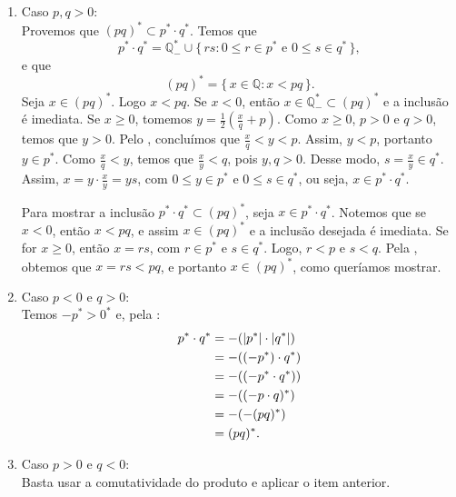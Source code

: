 \documentclass[../main.tex]{subfiles}
\begin{document}
\begin{dem}
\begin{enumerate}[label=(\roman*)]
        \begin{enumerate}
            \item Caso $p,q > 0$:  \\ 
            Provemos que $(pq)^* \subset p^* \cdot q^*$. Temos que 
            \[ p^* \cdot q^* = \mathbb{Q}_{-}^* \cup \{\,rs : 0 \leq r \in p^* \text{ e } 0 \leq s \in q^* \,\}, \] 
            e que 
            \[ (pq)^* = \{\,x \in \mathbb{Q} : x < pq\,\}. \] 
            Seja $x \in (pq)^*$. Logo $x < pq$.
        Se $x < 0$, então $x \in \mathbb{Q}_{-}^* \subset (pq)^*$ e a inclusão é imediata. Se $x \geq 0$, tomemos 
        $y = \frac{1}{2} \left(\frac{x}{q}+p\right)$.
        Como $x \geq 0$, $p>0$ e $q>0$, temos que $y > 0$. Pelo , concluímos que $\frac{x}{q} < y < p$. Assim, $y < p$, portanto $y \in p^*$. Como $\frac{x}{q} < y$, temos que $\frac{x}{y} < q$, pois $y,q > 0$. Desse modo, $s = \frac{x}{y} \in q^*$. Assim, 
        $x = y \cdot \frac{x}{y} = ys$, com $0 \leq y \in p^*$ e $0 \leq s \in q^*$, ou seja, $x \in p^* \cdot q^*$.

        Para mostrar a inclusão  $p^* \cdot q^* \subset (pq)^*$, seja $x \in p^* \cdot q^*$. Notemos que se $x < 0$, então $x < pq$, e assim $x \in (pq)^* $ e a inclusão desejada é imediata. Se for $x \geq 0$, então $x = rs$, com $r \in p^*$ e $s \in q^*$. Logo, $r<p$ e $s < q$. Pela , obtemos que $x=rs < pq$, e portanto $x \in (pq)^*$, como queríamos mostrar.

            \item Caso $p < 0$ e $q>0$: \\
            Temos $-p^* > 0^*$ e, pela :
            \begin{align*}
                p^* \cdot q^* 
                &= -( \abs{p^*} \cdot \abs{q^*} ) \\
                &= -((-p^*) \cdot q^*) \\
                &= - ((-p^* \cdot q^*)) \\
                &= - ((-p \cdot q)^*) \\
                &= - (- (pq)^*) \\
                &= (pq)^*.
            \end{align*}

            \item Caso $p>0$ e $q<0$:\\
            Basta usar a comutatividade do produto e aplicar o item anterior.


\end{enumerate}
\end{enumerate}
\end{dem}
\end{document}

